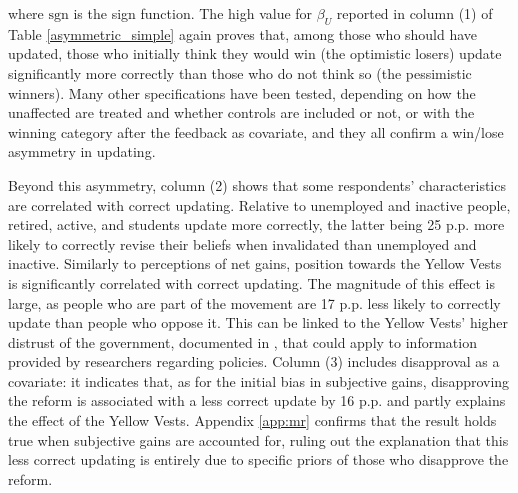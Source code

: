 \documentclass[12pt]{article} %
\providecommand{\DIFaddtex}[1]{{\protect\color{blue}\uwave{#1}}} %
\providecommand{\DIFaddbegin}{} %
\providecommand{\DIFaddend}{} %
\providecommand{\DIFadd}[1]{\texorpdfstring{\DIFaddtex{#1}}{#1}} %
\newcommand{\DIFaddincludegraphics}[2][]{{\color{blue}\fbox{\DIFOincludegraphics[#1]{#2}}}} %
\DeclareRobustCommand{\DIFaddbegin}{\DIFOaddbegin \let\includegraphics\DIFaddincludegraphics} %
\DeclareRobustCommand{\DIFaddend}{\DIFOaddend \let\includegraphics\DIFOincludegraphics} %
\begin{document}
\noindent
where $\text{sgn}$ is the sign function. The high value for $\beta_{U}$ reported in column (1) of Table \ref{asymmetric_simple} again proves that, among those who should have updated, those who initially think they would win (the optimistic losers) update significantly more correctly than those who do not think so (the pessimistic winners). Many other specifications have been tested, depending on how the unaffected are treated and whether controls are included or not, or with the winning category after the feedback as covariate, and they all confirm a win/lose asymmetry in updating.



Beyond this asymmetry, column (2) shows that some respondents' characteristics are correlated with correct updating. Relative to unemployed and inactive people, retired, active, and students update more correctly, the latter being 25 p.p. more likely to correctly revise their beliefs when invalidated than unemployed and inactive. Similarly to perceptions of net gains, position towards the Yellow Vests is significantly correlated with correct updating. The magnitude of this effect is large, as people who are part of the movement are 17 p.p. less likely to correctly update than people who oppose it. This can be linked to the Yellow Vests' higher distrust of the government, documented in \citet{algan_et_al_19}, that could apply to information provided by researchers regarding policies. Column (3) includes disapproval as a covariate: it indicates that, as for the initial bias in subjective gains, disapproving the reform is associated with a less correct update by 16 p.p. and partly explains the effect of the Yellow Vests. Appendix \ref{app:mr} confirms that the result holds true when \DIFaddbegin \DIFadd{initial }\DIFaddend subjective gains are accounted for, ruling out the explanation that this less correct updating is entirely due to specific priors of those who disapprove the reform. 
\end{document}
